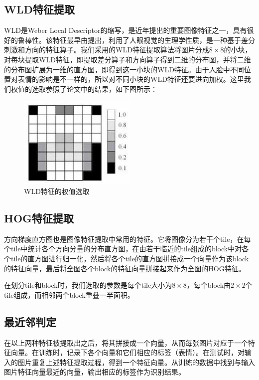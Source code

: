 \documentclass[UTF8]{ctexart}
\begin{document}
\subsection{WLD特征提取}

WLD是Weber Local Descriptor的缩写，是近年提出的重要图像特征之一，具有很好的鲁棒性。该特征最早由\cite{chen2010wld}提出，利用了人眼视觉的生理学性质，是一种基于差分刺激和方向的特征算子。我们采用的WLD特征提取算法将图片分成$8\times 8$的小块，对每块提取WLD特征，即提取差分算子和方向算子得到二维的分布图，并将二维的分布图扩展为一维的直方图，即得到这一小块的WLD特征。由于人脸中不同位置对表情的影响是不一样的，所以对不同小块的WLD特征还要进向加权。这里我们权值的选取参照了论文\cite{wang2013feature}中的结果，如下图所示：
\begin{figure}[ht]
  \centering
  \includegraphics[width=0.5\textwidth]{WLD.jpg}
  \caption{WLD特征的权值选取}\label{fig:wldweight}
\end{figure}

\subsection{HOG特征提取}

方向梯度直方图也是图像特征提取中常用的特征。它将图像分为若干个tile，在每个tile中统计各个方向分量的分布直方图，在由若干临近的tile组成的block中对各个tile的直方图进行归一化，然后将各个tile的直方图拼接成一个向量作为该block的特征向量，最后将全图各个block的特征向量拼接起来作为全图的HOG特征。

在划分tile和block时，我们选取的参数是每个tile大小为$8\times 8$，每个block由$2\times 2$个tile组成，而相邻两个block重叠一半面积。

\subsection{最近邻判定}

在以上两种特征被提取出之后，将其拼接成一个向量，从而每张图片对应于一个特征向量。在训练时，记录下各个向量和它们相应的标签（表情）。在测试时，对输入的图片重复上述特征提取过程，得到一个特征向量。从训练的数据中找到与输入图片特征向量最近的向量，输出相应的标签作为识别结果。
\end{document}
